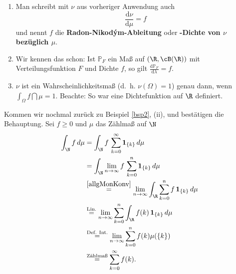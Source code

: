 \begin{bem}
	\begin{enumerate}[label=(\roman*)]
		\item Man schreibt mit $\nu$ aus vorheriger Anwendung auch \[ \frac{\mathrm{d}\nu}{\mathrm{d}\mu} = f \] und nennt $f$ die \textbf{Radon-Nikodým-Ableitung} oder \textbf{-Dichte von $\nu$ bez\"uglich $\mu$}.
		\item Wir kennen das schon: Ist $\mathbb{P}_F$ ein Maß auf $(\R, \cB(\R))$ mit Verteilungsfunktion $ F $ und Dichte $f$, so gilt $ \frac{\mathrm{d}\mathbb{P}_F}{\mathrm{d}\lambda} = f$.
		\item $\nu$ ist ein Wahrscheinlichkeitsmaß (\mbox{d. h.} $\nu(\Omega)=1$) genau dann, wenn $\int_{\Omega} f \dint \mu = 1$. Beachte: So war eine Dichtefunktion auf $\R$ definiert.
	\end{enumerate}
\end{bem}

\begin{anwendung}
	Kommen wir nochmal zur\"uck zu Beispiel \ref{bsp2}, (ii), und best\"atigen die Behauptung. Sei $f\geq 0$ und $\mu$ das Z\"ahlma\ss{} auf $\N$
	\begin{align*}
		\int_\N f \, d\mu
		&= \int_\N f\,\sum_{k=0}^\infty \mathbf 1_{\{k\}} \, d\mu\\
		&= \int_\N \lim_{n\to\infty}f \, \sum_{k=0}^n  \mathbf 1_{\{k\}} \, d\mu\\
		&\overset{\ref{allgMonKonv}}{=} \lim_{n\to\infty}\int_\R\sum_{k=0}^n f\, \mathbf 1_{\{k\}}\, d\mu\\
		&\overset{\text{Lin.}}{=} \lim_{n\to\infty}\sum_{k=0}^n \int_\R f(k)\, \mathbf 1_{\{k\}} \, d\mu\\
		&\overset{\text{Def. Int.}}{=} \lim_{n\to\infty}\sum_{k=0}^n f(k) \mu(\{k\})\\
		&\overset{\text{Z\"ahlma\ss }}{=}\sum_{k=0}^\infty f(k).
	\end{align*}
\end{anwendung}
